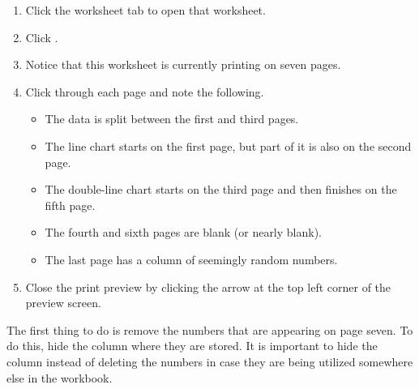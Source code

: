 \begin{enumerate}
	\item Click the  worksheet tab to open that worksheet.
	\item Click .
	\item Notice that this worksheet is currently printing on seven pages.
	\item Click through each page and note the following.

	\begin{itemize}
		\item The data is split between the first and third pages.
		\item The line chart starts on the first page, but part of it is also on the second page.
		\item The double-line chart starts on the third page and then finishes on the fifth page.
		\item The fourth and sixth pages are blank (or nearly blank).
		\item The last page has a column of seemingly random numbers.
	\end{itemize}

	\item Close the print preview by clicking the arrow at the top left corner of the preview screen.
\end{enumerate}

The first thing to do is remove the numbers that are appearing on page seven. To do this, hide the column where they are stored. It is important to hide the column instead of deleting the numbers in case they are being utilized somewhere else in the workbook.

